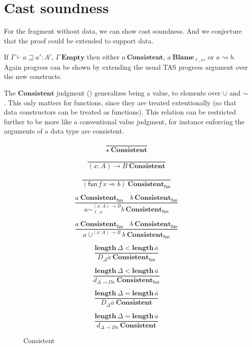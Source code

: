 \section{Cast soundness}

For the fragment without data, we can show cast soundness.
And we conjecture that the proof could be extended to support data.
 
If $\varGamma\vdash a\sqsupseteq a':A'$, $\varGamma\ \mathbf{Empty}$ then either $a\ \mathbf{Consistent}$, $a\ \mathbf{Blame}_{\ell,o}$, or $a\rightsquigarrow b$.
Again progress can be shown by extending the usual \ac{TAS} progress argument over the new constructs.

The $\mathbf{Consistent}$ judgment () generalizes being a value, to elements over $\cup$ and $\sim$.
This only matters for functions, since they are treated extentionally (so that data constructors can be treated as functions).
This relation can be restricted further to be more like a conventional value judgment, for instance enforcing the arguments of a data type are consistent.

\begin{figure}
\[
\frac{\ }{\star\ \mathbf{Consistent}}
\]

\[
\frac{\ }{\left(x:A\right)\rightarrow B\ \mathbf{Consistent}}
\]

\[
\frac{\ }{\left(\mathsf{fun}\,f\,x\Rightarrow b\right)\ \mathbf{Consistent_{\mathsf{fun}}}}
\]

\[
\frac{
  a\ \mathbf{Consistent_{\mathsf{fun}}}\quad b\ \mathbf{Consistent_{\mathsf{fun}}}
}{
  a\sim_{\ell,o}^{\left(x:A\right)\rightarrow B}b\ \mathbf{Consistent_{\mathsf{fun}}}}
\]

\[
\frac{
  a\ \mathbf{Consistent_{\mathsf{fun}}}\quad b\ \mathbf{Consistent_{\mathsf{fun}}}
}{
  a\cup^{\left(x:A\right)\rightarrow B}b\ \mathbf{Consistent_{\mathsf{fun}}}
}
\]

\[
\frac{
  \mathbf{length}\,\Delta < \mathbf{length}\,\overline{a}
}{
  D_{\Delta}\overline{a}\ \mathbf{Consistent_{\mathsf{fun}}}
}
\]

\[
\frac{
  \mathbf{length}\,\Delta < \mathbf{length}\,\overline{a}
}{
  d_{\Delta\rightarrow D\overline{a}}\ \mathbf{Consistent_{\mathsf{fun}}}
}
\]

\[
\frac{
  \mathbf{length}\,\Delta = \mathbf{length}\,\overline{a}
}{
  D_{\Delta}\overline{a}\ \mathbf{Consistent}
}
\]

\[
\frac{
  \mathbf{length}\,\Delta = \mathbf{length}\,\overline{a}
}{
  d_{\Delta\rightarrow D\overline{a}}\ \mathbf{Consistent}
}
\]

\caption{Consistent}
\label{fig:cast-data-val}
\end{figure}


